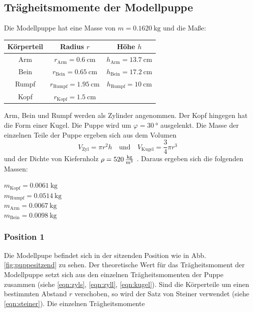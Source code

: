 \subsection{Trägheitsmomente der Modellpuppe}
Die Modellpuppe hat eine Masse von $m=\SI{0.1620}{\kg}$ und die Maße:\\
\begin{table}
    \centering
    \begin{tabular}{c|cc}
    \toprule
    Körperteil & Radius $r$ & Höhe $h$ \\ 
    \midrule
    Arm & $r_\text{Arm} = \SI{0.6}{\centi\metre}$ & \quad $h_\text{Arm} = \SI{13.7}{\centi\metre}$ \\
    Bein & $r_\text{Bein} = \SI{0.65}{\centi\metre}$ & \quad $h_\text{Bein} = \SI{17.2}{\centi\metre}$ \\
    Rumpf & $r_\text{Rumpf} = \SI{1.95}{\centi\metre}$ & \quad $h_\text{Rumpf} = \SI{10}{\centi\metre}$ \\
    Kopf & $r_\text{Kopf} = \SI{1.5}{\centi\metre}$ & \\
    \bottomrule
    \end{tabular}
\end{table}
\FloatBarrier
Arm, Bein und Rumpf werden als Zylinder angenommen.
Der Kopf hingegen hat die Form einer Kugel.
Die Puppe wird um $\varphi = \SI{30}{\degree}$ ausgelenkt.
Die Masse der einzelnen Teile der Puppe ergeben sich aus dem Volumen
\begin{equation*}
    V_\text{Zyl} = \pi r^2 h \quad \text{und} \quad V_\text{Kugel} = \frac{3}{4}\pi r^3
\end{equation*}
und der Dichte von Kiefernholz $\rho = \SI{520}{\frac{\kg}{\metre^3}}$ \cite{holz}.
Daraus ergeben sich die folgenden Massen:\\
\begin{center}
    $m_\text{Kopf} = \SI{0.0061}{\kg}$ \\
    $m_\text{Rumpf} = \SI{0.0514}{\kg}$ \\
    $m_\text{Arm} = \SI{0.0067}{\kg}$ \\
    $m_\text{Bein} = \SI{0.0098}{\kg}$ \\
\end{center}
\subsubsection{Position 1}
Die Modellpupe befindet sich in der sitzenden Position wie in Abb. \ref{fig:puppesitzend} zu sehen.
Der theoretische Wert für das Trägheitsmoment der Modellpuppe setzt sich aus den einzelnen Trägheitsmomenten der Puppe zusammen (siehe \autoref{eqn:zyls}, \autoref{eqn:zyll}, \autoref{eqn:kugel}).
Sind die Körperteile um einen bestimmten Abstand $r$ verschoben, so wird der Satz von Steiner verwendet (siehe \autoref{eqn:steiner}).
Die einzelnen Trägheitsmomente

